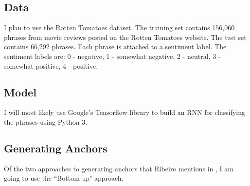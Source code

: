 \documentclass[12pt, letterpaper]{article}
\begin{document}
\subsection{Data}
\par I plan to use the Rotten Tomatoes dataset. The training set contains 156,060 phrases from movie reviews posted on the Rotten Tomatoes website. The test set contains 66,292 phrases. Each phrase is attached to a sentiment label. The sentiment labels are: 0 - negative, 1 - somewhat negative, 2 - neutral, 3 - somewhat positive, 4 - positive.
\subsection{Model}
\par I will most likely use Google's Tensorflow \cite{tensorflow} library to build an RNN for classifying the phrases using Python 3.  
\subsection{Generating Anchors}
\par Of the two approaches to generating anchors that Ribeiro mentions in \cite{anchors}, I am going to use the ``Bottom-up" approach.



\end{document}
